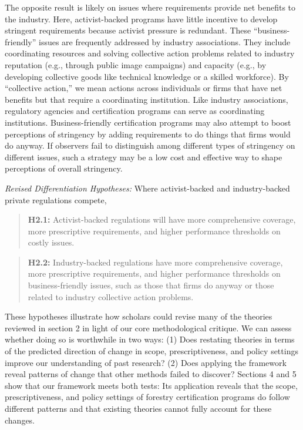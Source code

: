 \documentclass[
      12pt,
            Review ]{article}
\begin{document}
The opposite result is likely on issues where requirements provide net benefits to the industry. Here, activist-backed programs have little incentive to develop stringent requirements because activist pressure is redundant. These ``business-friendly'' issues are frequently addressed by industry associations. They include coordinating resources and solving collective action problems related to industry reputation (e.g., through public image campaigns) and capacity (e.g., by developing collective goods like technical knowledge or a skilled workforce). By ``collective action,'' we mean actions across individuals or firms that have net benefits but that require a coordinating institution. Like industry associations, regulatory agencies and certification programs can serve as coordinating institutions. Business-friendly certification programs may also attempt to boost perceptions of stringency by adding requirements to do things that firms would do anyway. If observers fail to distinguish among different types of stringency on different issues, such a strategy may be a low cost and effective way to shape perceptions of overall stringency.

\emph{Revised Differentiation Hypotheses:} Where activist-backed and industry-backed private regulations compete,

\begin{quote}
\textbf{H2.1:} Activist-backed regulations will have more comprehensive coverage, more prescriptive requirements, and higher performance thresholds on costly issues.
\end{quote}

\begin{quote}
\textbf{H2.2:} Industry-backed regulations have more comprehensive coverage, more prescriptive requirements, and higher performance thresholds on business-friendly issues, such as those that firms do anyway or those related to industry collective action problems.
\end{quote}

These hypotheses illustrate how scholars could revise many of the theories reviewed in section 2 in light of our core methodological critique. We can assess whether doing so is worthwhile in two ways: (1) Does restating theories in terms of the predicted direction of change in scope, prescriptiveness, and policy settings improve our understanding of past research? (2) Does applying the framework reveal patterns of change that other methods failed to discover? Sections 4 and 5 show that our framework meets both tests: Its application reveals that the scope, prescriptiveness, and policy settings of forestry certification programs do follow different patterns and that existing theories cannot fully account for these changes.
\end{document}
